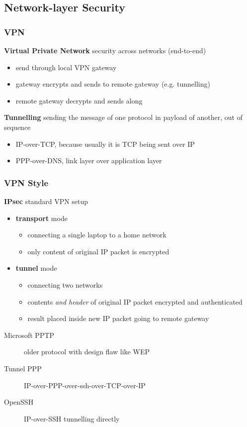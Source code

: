 \documentclass[]{article}
\theoremstyle{definition}
\begin{document}
	\subsection{Network-layer Security}
	\subsubsection{VPN}
	\textbf{Virtual Private Network} security across networks (end-to-end)
	\begin{itemize}
		\item send through local VPN gateway
		\item gateway encrypts and sends to remote gateway (e.g. tunnelling)
		\item remote gateway decrypts and sends along
	\end{itemize}
	\textbf{Tunnelling} sending the message of one protocol in payload of another, out of sequence
	\begin{itemize}
		\item IP-over-TCP, because usually it is TCP being sent over IP
		\item PPP-over-DNS, link layer over application layer
	\end{itemize}
	\subsubsection{VPN Style}
	\textbf{IPsec} standard VPN setup
	\begin{itemize}
		\item \textbf{transport} mode
			\begin{itemize}
				\item connecting a single laptop to a home network
				\item only content of original IP packet is encrypted
			\end{itemize}
		\item \textbf{tunnel} mode
			\begin{itemize}
				\item connecting two networks
				\item contents \textit{and header} of original IP packet encrypted and authenticated
				\item result placed inside new IP packet going to remote gateway
			\end{itemize}
	\end{itemize}
	\begin{description}
		\item[Microsoft PPTP] older protocol with design flaw like WEP
		\item[Tunnel PPP] IP-over-PPP-over-ssh-over-TCP-over-IP
		\item[OpenSSH] IP-over-SSH tunnelling directly
	\end{description}
\end{document}
